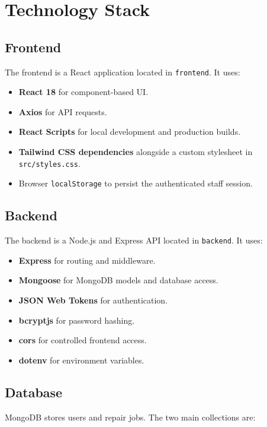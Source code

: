 \documentclass[12pt,a4paper]{report}
\begin{document}
\chapter{Technology Stack}

\section{Frontend}

The frontend is a React application located in \texttt{frontend}. It uses:

\begin{itemize}
  \item \textbf{React 18} for component-based UI.
  \item \textbf{Axios} for API requests.
  \item \textbf{React Scripts} for local development and production builds.
  \item \textbf{Tailwind CSS dependencies} alongside a custom stylesheet in \texttt{src/styles.css}.
  \item Browser \texttt{localStorage} to persist the authenticated staff session.
\end{itemize}

\section{Backend}

The backend is a Node.js and Express API located in \texttt{backend}. It uses:

\begin{itemize}
  \item \textbf{Express} for routing and middleware.
  \item \textbf{Mongoose} for MongoDB models and database access.
  \item \textbf{JSON Web Tokens} for authentication.
  \item \textbf{bcryptjs} for password hashing.
  \item \textbf{cors} for controlled frontend access.
  \item \textbf{dotenv} for environment variables.
\end{itemize}

\section{Database}

MongoDB stores users and repair jobs. The two main collections are:
\end{document}
